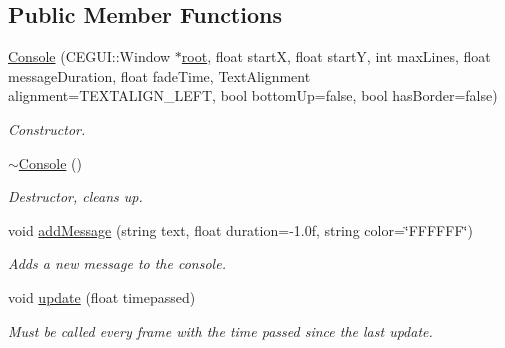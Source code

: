 \subsection*{\-Public \-Member \-Functions}
\begin{DoxyCompactItemize}
\item 
\hypertarget{classConsole_abe8469565f7c663334d1fe931275ffb6}{
\hyperlink{classConsole_abe8469565f7c663334d1fe931275ffb6}{\-Console} (\-C\-E\-G\-U\-I\-::\-Window $\ast$\hyperlink{classConsole_a12561be00e1ffed1e3e9e3166f064934}{root}, float start\-X, float start\-Y, int max\-Lines, float message\-Duration, float fade\-Time, \-Text\-Alignment alignment=\-T\-E\-X\-T\-A\-L\-I\-G\-N\-\_\-\-L\-E\-F\-T, bool bottom\-Up=false, bool has\-Border=false)}
\label{d2/d24/classConsole_abe8469565f7c663334d1fe931275ffb6}

\begin{DoxyCompactList}\small\item\em \-Constructor. \end{DoxyCompactList}\item 
\hypertarget{classConsole_a32e8c79c8579b1b076e53848c540d4e7}{
\hyperlink{classConsole_a32e8c79c8579b1b076e53848c540d4e7}{$\sim$\-Console} ()}
\label{d2/d24/classConsole_a32e8c79c8579b1b076e53848c540d4e7}

\begin{DoxyCompactList}\small\item\em \-Destructor, cleans up. \end{DoxyCompactList}\item 
\hypertarget{classConsole_a9b60f177e6a6e31ac88f6554d6e7d2ae}{
void \hyperlink{classConsole_a9b60f177e6a6e31ac88f6554d6e7d2ae}{add\-Message} (string text, float duration=-\/1.\-0f, string color=\char`\"{}\-F\-F\-F\-F\-F\-F\char`\"{})}
\label{d2/d24/classConsole_a9b60f177e6a6e31ac88f6554d6e7d2ae}

\begin{DoxyCompactList}\small\item\em \-Adds a new message to the console. \end{DoxyCompactList}\item 
\hypertarget{classConsole_a5d3569628e0df8574c3384e27b148556}{
void \hyperlink{classConsole_a5d3569628e0df8574c3384e27b148556}{update} (float timepassed)}
\label{d2/d24/classConsole_a5d3569628e0df8574c3384e27b148556}

\begin{DoxyCompactList}\small\item\em \-Must be called every frame with the time passed since the last update. \end{DoxyCompactList}\end{DoxyCompactItemize}
